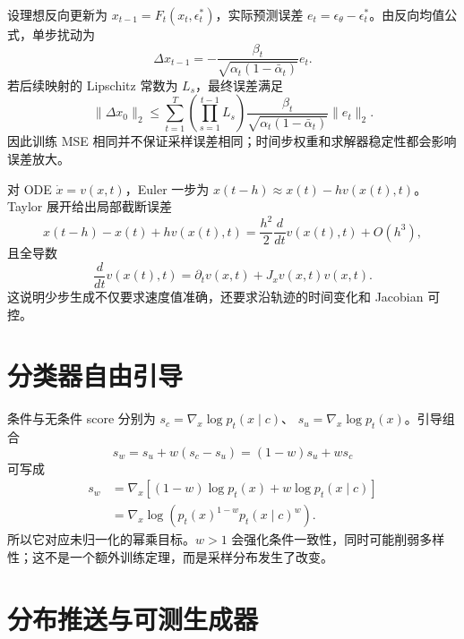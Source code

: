 \documentclass[11pt]{article}
\numberwithin{equation}{section}
\newcommand{\1}{\mathbf{1}}
\begin{document}
设理想反向更新为 $x_{t-1}=F_t(x_t,\epsilon^*_t)$，实际预测误差
$e_t=\epsilon_\theta-\epsilon^*_t$。由反向均值公式，单步扰动为
\begin{equation}
 \Delta x_{t-1}
 =-\frac{\beta_t}{\sqrt{\alpha_t(1-\bar\alpha_t)}}e_t.
\end{equation}
若后续映射的 Lipschitz 常数为 $L_s$，最终误差满足
\begin{equation}
 \|\Delta x_0\|_2
 \le\sum_{t=1}^{T}
 \left(\prod_{s=1}^{t-1}L_s\right)
 \frac{\beta_t}{\sqrt{\alpha_t(1-\bar\alpha_t)}}\|e_t\|_2.
\end{equation}
因此训练 MSE 相同并不保证采样误差相同；时间步权重和求解器稳定性都会影响误差放大。

对 ODE $\dot x=v(x,t)$，Euler 一步为
$x(t-h)\approx x(t)-hv(x(t),t)$。Taylor 展开给出局部截断误差
\begin{equation}
 x(t-h)-x(t)+hv(x(t),t)
 =\frac{h^2}{2}\frac{d}{dt}v(x(t),t)+O(h^3),
\end{equation}
且全导数
\begin{equation}
 \frac{d}{dt}v(x(t),t)=\partial_tv(x,t)+J_xv(x,t)v(x,t).
\end{equation}
这说明少步生成不仅要求速度值准确，还要求沿轨迹的时间变化和 Jacobian 可控。

\section{分类器自由引导}

条件与无条件 score 分别为 $s_c=\nabla_x\log p_t(x\mid c)$、
$s_u=\nabla_x\log p_t(x)$。引导组合
\begin{equation}
 s_w=s_u+w(s_c-s_u)=(1-w)s_u+ws_c
\end{equation}
可写成
\begin{align}
 s_w
 &=\nabla_x\left[(1-w)\log p_t(x)+w\log p_t(x\mid c)\right]\\
 &=\nabla_x\log\left(p_t(x)^{1-w}p_t(x\mid c)^w\right).
\end{align}
所以它对应未归一化的幂乘目标。$w>1$ 会强化条件一致性，同时可能削弱多样性；这不是一个额外训练定理，而是采样分布发生了改变。

\section{分布推送与可测生成器}
\end{document}
